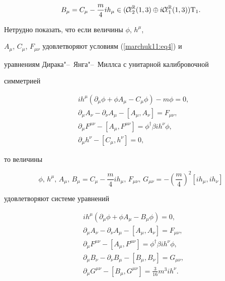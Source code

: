 $$

B_\mu=C_\mu-\frac{m}{4}i h_\mu\in({\mathcal{C\!\ell}}_2^{\mathbb R}(1, 3)\oplus

i{\mathcal{C\!\ell}}_1^{\mathbb R}(1, 3)){\rm T}_1.

$$



Нетрудно показать,  что если величины $\phi$,  $h^\mu$, 

$A_\mu$,  $C_\mu$,  $F_{\mu\nu}$ удовлетворяют условиям (\ref{marchuk11:eq4}) и

уравнениям Дирака"--~Янга"--~Миллса с унитарной калибровочной

симметрией

\begin{align}

\label{marchuk11:eq5}

& i h^\mu(\partial_\mu\phi+\phi A_\mu-C_\mu\phi)-m\phi=0, \nonumber\\

& \partial_\mu A_\nu-\partial_\nu A_\mu-[A_\mu, A_\nu]=F_{\mu\nu}, \\

& \partial_\mu F^{\mu\nu}-[A_\mu, F^{\mu\nu}] =\phi^\dagger \beta i

h^\nu\phi\nonumber, \\

& \partial_\mu h^\nu-[C_\mu, h^\nu]=0, \nonumber

\end{align}

то величины

$$

\phi, \,h^\mu, \,A_\mu, \,B_\mu=C_\mu-\frac{m}{4}i h_\mu, \,

F_{\mu\nu}, \,G_{\mu\nu}=-\left(\frac{m}{4}\right)^2[i h_\mu, i

h_\nu]

$$

удовлетворяют системе уравнений

\begin{align}

\label{marchuk11:eq6}

& i h^\mu(\partial_\mu\phi+\phi A_\mu-B_\mu\phi)=0, \nonumber\\

& \partial_\mu A_\nu-\partial_\nu A_\mu-[A_\mu, A_\nu]=F_{\mu\nu}, 

\nonumber\\

& \partial_\mu F^{\mu\nu}-[A_\mu, F^{\mu\nu}] =\phi^\dagger \beta i

h^\nu\phi, \\

& \partial_\mu B_\nu-\partial_\nu B_\mu-[B_\mu, B_\nu]=G_{\mu\nu}, 

\nonumber\\

& \partial_\mu G^{\mu\nu}-[B_\mu, G^{\mu\nu}] =\frac{3}{16}m^3 i

h^\nu. \nonumber

\end{align}

